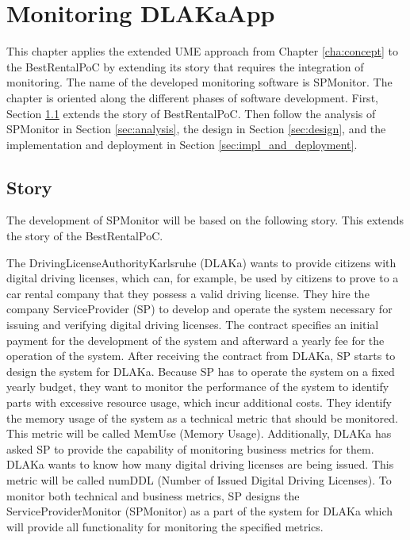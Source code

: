 \chapter{Monitoring DLAKaApp}
\label{cha:first_solution}

This chapter applies the extended UME approach from Chapter \ref{cha:concept}
to the BestRentalPoC by extending its story that requires the integration of
monitoring. The name of the developed monitoring software is SPMonitor. The
chapter is oriented along the different phases of software development. First,
Section \ref{sec:story} extends the story of BestRentalPoC. Then follow
the analysis of SPMonitor in Section \ref{sec:analysis}, the design in Section
\ref{sec:design}, and the implementation and deployment in Section
\ref{sec:impl_and_deployment}.

\section{Story}
\label{sec:story}

The development of SPMonitor will be based on the following story.
This extends the story of the BestRentalPoC.

The DrivingLicenseAuthorityKarlsruhe (DLAKa) wants to provide citizens with
digital driving licenses, which can, for example, be used by citizens to prove
to a car rental company that they possess a valid driving license. They hire
the company ServiceProvider (SP) to develop and operate the system necessary
for issuing and verifying digital driving licenses. The contract specifies an
initial payment for the development of the system and afterward a yearly fee
for the operation of the system. After receiving the contract from DLAKa, SP
starts to design the system for DLAKa. Because SP has to operate the system on
a fixed yearly budget, they want to monitor the performance of the system to
identify parts with excessive resource usage, which incur additional costs.
They identify the memory usage of the system as a technical metric that should
be monitored. This metric will be called MemUse (Memory Usage). Additionally,
DLAKa has asked SP to provide the capability of monitoring business
metrics for them. DLAKa wants to know how many digital driving licenses
are being issued. This metric will be called numDDL (Number of Issued Digital
Driving Licenses). To monitor both technical and business metrics, SP designs
the ServiceProviderMonitor (SPMonitor) as a part of the system for DLAKa
which will provide all functionality for monitoring the specified metrics.

